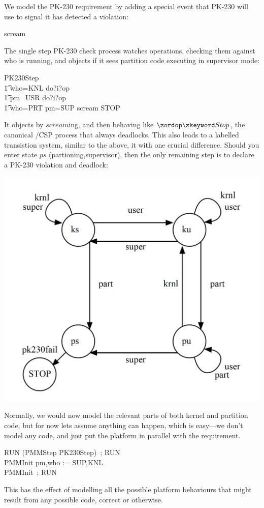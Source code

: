 We model the PK-230 requirement by adding a special event that PK-230
will use to signal it has detected a violation:
\begin{circus}
\circchannel scream
\end{circus}
The single step PK-230 check process watches operations,
checking them against who is running, and objects if it sees
partition code executing in supervisor mode:
\begin{circus}
PK230Step  \\
\t1 who=KNL \circguard do?i?op \then \Skip \\
\t1 pm=USR \circguard do?i?op \then \Skip \\
\t1 who=PRT \land pm=SUP \circguard scream \then STOP
\end{circus}
It objects by $scream$ing, and then behaving like $\Stop$,
the canonical \Circus/CSP process that always deadlocks.
This also leads to a labelled transistion system,
similar to the above, it with one crucial difference.
Should you enter state $ps$ (partioning,supervisor),
then the only remaining step is to declare a PK-230 violation and deadlock:

\includegraphics[scale=0.35]{images/PK230LTS}

Normally, we would now model the relevant parts of both kernel and
partition code, but for now lets assume anything can happen,
which is easy---we don't model any code, and just put the platform
in parallel with the requirement.
\begin{circus}
RUN  (PMMStep \interleave PK230Step)~; RUN\\
PMMInit  pm,who := SUP,KNL \\
PMMInit~; RUN
\end{circus}
This has the effect of modelling
all the possible platform behaviours that might result from any
possible code, correct or otherwise.

